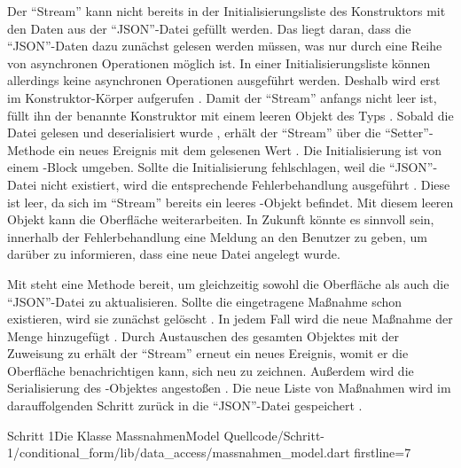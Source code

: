 Der \enquote{Stream} kann nicht bereits in der Initialisierungsliste des Konstruktors mit den Daten aus der \enquote{JSON}-Datei gefüllt werden.
Das liegt daran, dass die \enquote{JSON}-Daten dazu zunächst gelesen werden müssen, was nur durch eine Reihe von asynchronen Operationen möglich ist.
In einer Initialisierungsliste können allerdings keine asynchronen Operationen ausgeführt werden.
Deshalb wird  erst im Konstruktor-Körper aufgerufen .
Damit der \enquote{Stream} anfangs nicht leer ist, füllt ihn der benannte Konstruktor  mit einem leeren Objekt des Typs  .
Sobald die Datei gelesen  und deserialisiert wurde , erhält der \enquote{Stream} über die \enquote{Setter}-Methode  ein neues Ereignis mit dem gelesenen Wert .
Die Initialisierung ist von einem -Block umgeben.
Sollte die Initialisierung fehlschlagen, weil die \enquote{JSON}-Datei nicht existiert, wird die entsprechende Fehlerbehandlung ausgeführt .
Diese ist leer, da sich im \enquote{Stream} bereits ein leeres -Objekt  befindet.
Mit diesem leeren Objekt kann die Oberfläche weiterarbeiten.
In Zukunft könnte es sinnvoll sein, innerhalb der Fehlerbehandlung eine Meldung an den Benutzer zu geben, um darüber zu informieren, dass eine neue Datei angelegt wurde.

Mit   steht eine Methode bereit, um gleichzeitig sowohl die Oberfläche als auch die \enquote{JSON}-Datei zu aktualisieren.
Sollte die eingetragene Maßnahme schon existieren, wird sie zunächst gelöscht .
In jedem Fall wird die neue Maßnahme der Menge  hinzugefügt .
Durch Austauschen des gesamten Objektes mit der Zuweisung zu   erhält der \enquote{Stream} erneut ein neues Ereignis, womit er die Oberfläche benachrichtigen kann,
sich neu zu zeichnen.
Außerdem wird die Serialisierung des -Objektes angestoßen .
Die neue Liste von Maßnahmen wird im darauffolgenden Schritt zurück in die \enquote{JSON}-Datei gespeichert .

\begin{alexlisting}{Schritt 1}{Die Klasse MassnahmenModel}
  {Quellcode/Schritt-1/conditional_form/lib/data_access/massnahmen_model.dart}
  {firstline=7}
  \label{lst:Schritt1KlasseMassnahmenModel}
\end{alexlisting}
